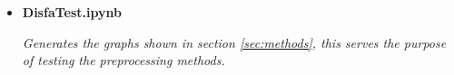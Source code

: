 {\begin{itemize}
\begin{itemize}
\begin{figure}[!h]
                    \caption{{\bf viewResult.ipynb: } A small part of the notebook showing graphs related to F1, Precision and ROC for one experiment.}
                    \label{fig:viewresult}
                    \end{figure}
                  \item {\bf DisfaTest.ipynb }
                  \begin{sloppypar} \textit{Generates the graphs shown in section \ref{sec:methods}, this serves the purpose of
                    testing the preprocessing methods.}\end{sloppypar}
                \end{itemize}

      \end{itemize}
      }
